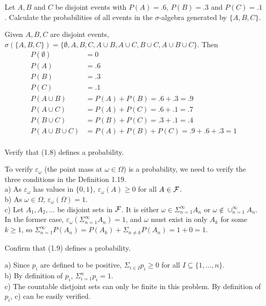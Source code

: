 \begin{exercise}
  Let $A, B$ and $C$ be disjoint events with $P(A)=.6$, $P(B)=.3$ and $P(C)=.1$. Calculate the probabilities of all events in the $\sigma$-algebra generated by $\{ A, B, C \} $.
\end{exercise}
\begin{solution}
  Given $A, B, C$ are disjoint events, $\sigma(\{ A, B, C \} ) = \{ \emptyset, A, B, C, A\cup B, A\cup C, B\cup C, A\cup B\cup C \} $. Then
  \begin{align*}
    P(\emptyset) &= 0 \\
    P(A) &= .6 \\
    P(B) &= .3 \\
    P(C) &= .1 \\
    P(A\cup B) &= P(A) + P(B) = .6 + .3 = .9 \\
    P(A\cup C) &= P(A) + P(C) = .6 + .1 = .7  \\
    P(B\cup C) &= P(B) + P(C) = .3 + .1 = .4  \\
    P(A\cup B\cup C) &= P(A) + P(B) + P(C) = .9 + .6 + .3 = 1 \\
  \end{align*}
\end{solution}


\begin{exercise}
  Verify that (1.8) defines a probability.
\end{exercise}
\begin{solution}
  To verify $\varepsilon_\omega$ (the point mass at $\omega\in\Omega$) is a probability, we need to verify the three conditions in the Definition 1.19. \\
  a) As $\varepsilon_\omega$ has values in $\{ 0, 1 \} $, $\varepsilon_\omega(A)\geq 0$ for all $A\in\cal F$. \\
  b) As $\omega\in\Omega$, $\varepsilon_\omega(\Omega) = 1$. \\
  c) Let $A_1, A_2, \ldots$ be disjoint sets in $\cal F$. It is either $\omega\in\Sigma_{n=1}^\infty A_n$ or $\omega\notin\cup_{n=1}^\infty A_n$. \\
  In the former case, $\varepsilon_\omega(\Sigma_{n=1}^\infty A_n) = 1$, and $\omega$ must exist in only $A_k$ for some $k\geq 1$, so $\Sigma_{n=1}^\infty P(A_n) = P(A_k) + \Sigma_{n\neq k} P(A_n) = 1 + 0 = 1$.
\end{solution}


\begin{exercise}
  Confirm that (1.9) defines a probability.
\end{exercise}
\begin{solution}
  a) Since $p_i$ are defined to be positive, $\Sigma_{i\in I}p_i\geq 0$ for all $I\subseteq \{ 1,\ldots, n \} $. \\
  b) By definition of $p_i$, $\Sigma_{i=1}^n p_i=1$. \\
  c) The countable distjoint sets can only be finite in this problem. By definition of $p_i$, c) can be easily verified.
\end{solution}


